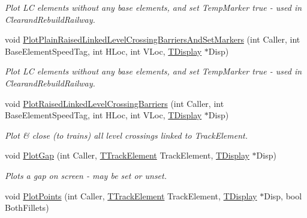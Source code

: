 \begin{DoxyCompactItemize}
\begin{DoxyCompactList}\small\item\em Plot LC elements without any base elements, and set Temp\+Marker true -\/ used in Clearand\+Rebuild\+Railway. \end{DoxyCompactList}\item 
\mbox{\label{class_t_track_a1f59015a92ef00604156a44011b4f4c8}} 
void \mbox{\hyperlink{class_t_track_a1f59015a92ef00604156a44011b4f4c8}{Plot\+Plain\+Raised\+Linked\+Level\+Crossing\+Barriers\+And\+Set\+Markers}} (int Caller, int Base\+Element\+Speed\+Tag, int H\+Loc, int V\+Loc, \mbox{\hyperlink{class_t_display}{T\+Display}} $\ast$Disp)
\begin{DoxyCompactList}\small\item\em Plot LC elements without any base elements, and set Temp\+Marker true -\/ used in Clearand\+Rebuild\+Railway. \end{DoxyCompactList}\item 
\mbox{\label{class_t_track_adbaf9ab8b709af9d194603892ac91133}} 
void \mbox{\hyperlink{class_t_track_adbaf9ab8b709af9d194603892ac91133}{Plot\+Raised\+Linked\+Level\+Crossing\+Barriers}} (int Caller, int Base\+Element\+Speed\+Tag, int H\+Loc, int V\+Loc, \mbox{\hyperlink{class_t_display}{T\+Display}} $\ast$Disp)
\begin{DoxyCompactList}\small\item\em Plot \& close (to trains) all level crossings linked to Track\+Element. \end{DoxyCompactList}\item 
\mbox{\label{class_t_track_aa638a7e118fb22e648d89adbe814a4a1}} 
void \mbox{\hyperlink{class_t_track_aa638a7e118fb22e648d89adbe814a4a1}{Plot\+Gap}} (int Caller, \mbox{\hyperlink{class_t_track_element}{T\+Track\+Element}} Track\+Element, \mbox{\hyperlink{class_t_display}{T\+Display}} $\ast$Disp)
\begin{DoxyCompactList}\small\item\em Plots a gap on screen -\/ may be set or unset. \end{DoxyCompactList}\item 
void \mbox{\hyperlink{class_t_track_af56adb319c7003b8ddac8e55afaee3d2}{Plot\+Points}} (int Caller, \mbox{\hyperlink{class_t_track_element}{T\+Track\+Element}} Track\+Element, \mbox{\hyperlink{class_t_display}{T\+Display}} $\ast$Disp, bool Both\+Fillets)

\end{DoxyCompactItemize}
